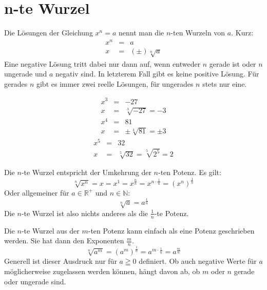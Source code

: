 \section{n-te Wurzel}

\begin{defi}[n-te Wurzel]
 Die Lösungen der Gleichung \(x^n=a\) nennt man die \(n\)-ten Wurzeln von \(a\). Kurz:
 \begin{eqnarray*}
  x^n &=& a \\
  x &=& (\pm)\sqrt[n]{a}
 \end{eqnarray*}
 Eine negative Lösung tritt dabei nur dann auf, wenn entweder \(n\) gerade ist oder \(n\) ungerade und \(a\) negativ sind. In letzterem Fall gibt es keine positive Lösung.
 Für gerades \(n\) gibt es immer zwei reelle Lösungen, für ungerades \(n\) stets nur eine.
\end{defi}

\begin{bsp}
 \begin{eqnarray*}
  x^3 &=& -27 \\
  x &=& \sqrt[3]{-27} = -3
 \end{eqnarray*}
 \begin{eqnarray*}
  x^4 &=& 81 \\
  x &=& \pm \sqrt[4]{81} = \pm 3
 \end{eqnarray*}
 \begin{eqnarray*}
  x^5 &=& 32 \\
  x&=& \sqrt[5]{32} = \sqrt[5]{2^5} = 2
 \end{eqnarray*}

\end{bsp}

\begin{regel}
 Die \(n\)-te Wurzel entspricht der Umkehrung der \(n\)-ten Potenz. Es gilt:
 \Large
 \begin{equation*}
  \sqrt[n]{x^n} = x = x^1 = x^{\frac{n}{n}} = x^{n\cdot \frac{1}{n}} = \left(x^n\right)^{\frac{1}{n}}
 \end{equation*}
 \normalsize
 Oder allgemeiner für \(a\in\mathbb{R}^+\) und \(n\in\mathbb{N}\):
 \Large
 \begin{equation*}
  \sqrt[n]{a} = a^{\frac{1}{n}}
 \end{equation*}\normalsize
 Die \(n\)-te Wurzel ist also nichts anderes als die \(\frac{1}{n}\)-te Potenz.
\end{regel}

\begin{regel}
 Die \(n\)-te Wurzel aus der \(m\)-ten Potenz kann einfach als eine Potenz geschrieben werden. Sie hat dann den Exponenten \(\frac{m}{n}\).
 \begin{equation*}
  \sqrt[n]{a^m} = \left(a^m\right)^{\frac{1}{n}} = a^{m\cdot \frac{1}{n}} = a^{\frac{m}{n}}
 \end{equation*}
 Generell ist dieser Ausdruck nur für \(a\geqq 0\) definiert. Ob auch negative Werte für \(a\) möglicherweise zugelassen werden können, hängt davon ab, ob \(m\) oder \(n\) gerade oder ungerade sind.
\end{regel}

